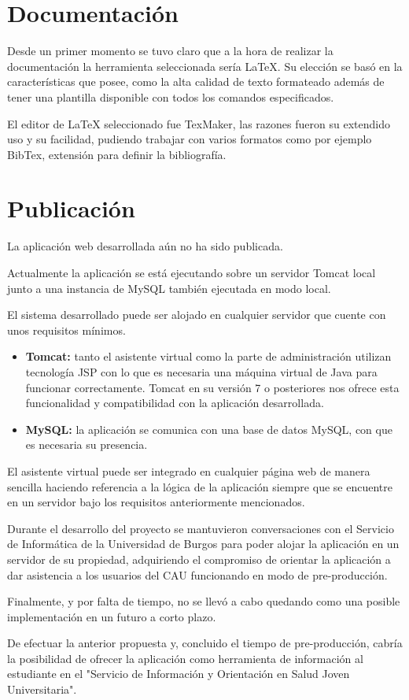 \section{Documentación}

Desde un primer momento se tuvo claro que a la hora de realizar la documentación la herramienta seleccionada sería LaTeX. Su elección se basó en la características que posee, como la alta calidad de texto formateado además de tener una plantilla disponible con todos los comandos especificados.

El editor de LaTeX seleccionado fue TexMaker, las razones fueron su extendido uso y su facilidad, pudiendo trabajar con varios formatos como por ejemplo BibTex, extensión para definir la bibliografía.

\section{Publicación}

La aplicación web desarrollada aún no ha sido publicada.

Actualmente la aplicación se está ejecutando sobre un servidor Tomcat local junto a una instancia de MySQL también ejecutada en modo local.

El sistema desarrollado puede ser alojado en cualquier servidor que cuente con unos requisitos mínimos.

\begin{itemize}
\tightlist
\item \textbf{Tomcat:} tanto el asistente virtual como la parte de administración utilizan tecnología JSP con lo que es necesaria una máquina virtual de Java para funcionar correctamente. Tomcat en su versión 7 o posteriores nos ofrece esta funcionalidad y compatibilidad con la aplicación desarrollada.
\item \textbf{MySQL:} la aplicación se comunica con una base de datos MySQL, con que es necesaria su presencia.
\end{itemize}

El asistente virtual puede ser integrado en cualquier página web de manera sencilla haciendo referencia a la lógica de la aplicación siempre que se encuentre en un servidor bajo los requisitos anteriormente mencionados.

Durante el desarrollo del proyecto se mantuvieron conversaciones con el Servicio de Informática de la Universidad de Burgos para poder alojar la aplicación en un servidor de su propiedad, adquiriendo el compromiso de orientar la aplicación a dar asistencia a los usuarios del CAU funcionando en modo de pre-producción.

Finalmente, y por falta de tiempo, no se llevó a cabo quedando como una posible implementación en un futuro a corto plazo.

De efectuar la anterior propuesta y, concluido el tiempo de pre-producción, cabría la posibilidad de ofrecer la aplicación como herramienta de información al estudiante en el "Servicio de Información y Orientación en Salud Joven Universitaria".